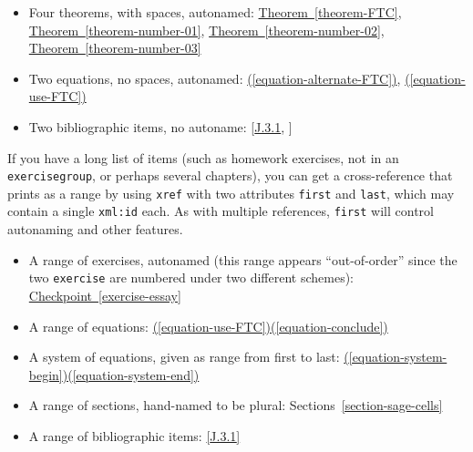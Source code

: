 \documentclass{amsart}
\theoremstyle{plain}%
\theoremstyle{definition}%
\theoremstyle{remark}%
\newcommand{\xreffont}{\relax}
\newcommand{\mono}[1]{\texttt{#1}}
\numberwithin{equation}{section}
\begin{document}
\begin{itemize}[label=\textbullet]
\item{}Four theorems, with spaces, autonamed: \hyperref[theorem-FTC]{Theorem~{\xreffont\ref{theorem-FTC}}}, \hyperref[theorem-number-01]{Theorem~{\xreffont\ref{theorem-number-01}}}, \hyperref[theorem-number-02]{Theorem~{\xreffont\ref{theorem-number-02}}}, \hyperref[theorem-number-03]{Theorem~{\xreffont\ref{theorem-number-03}}}%
\item{}Two equations, no spaces, autonamed: \hyperref[equation-alternate-FTC]{({\xreffont\ref{equation-alternate-FTC}})}, \hyperref[equation-use-FTC]{({\xreffont\ref{equation-use-FTC}})}%
\item{}Two bibliographic items, no autoname: [\hyperlink{biblio-judson-AATA}{{\xreffont J.3.1}}, \hyperlink{biblio-lay-article}{{\xreffont 2}}]%
\end{itemize}
%
\par
If you have a long list of items (such as homework exercises, not in an \mono{exercisegroup}, or perhaps several chapters), you can get a cross-reference that prints as a range by using \mono{xref} with two attributes \mono{first} and \mono{last}, which may contain a single \mono{xml:id} each.  As with multiple references, \mono{first} will control autonaming and other features.%
\begin{itemize}[label=\textbullet]
\item{}A range of exercises, autonamed (this range appears ``out-of-order'' since the two \mono{exercise} are numbered under two different schemes): \hyperref[exercise-essay]{Checkpoint~{\xreffont\ref{exercise-essay}}\textendash{}{\xreffont 4.2.3.1}}%
\item{}A range of equations: \hyperref[equation-use-FTC]{({\xreffont\ref{equation-use-FTC}})\textendash{}({\xreffont\ref{equation-conclude}})}%
\item{}A system of equations, given as range from first to last: \hyperref[equation-system-begin]{({\xreffont\ref{equation-system-begin}})\textendash{}({\xreffont\ref{equation-system-end}})}%
\item{}A range of sections, hand-named to be plural: Sections~\hyperref[section-sage-cells]{{\xreffont\ref{section-sage-cells}}\textendash{}{\xreffont\ref{section-cross-referencing}}}%
\item{}A range of bibliographic items: \hyperlink{biblio-judson-AATA}{[{\xreffont J.3.1}\textendash{}{\xreffont 2}]}%
\end{itemize}
%
\par
\end{document}

